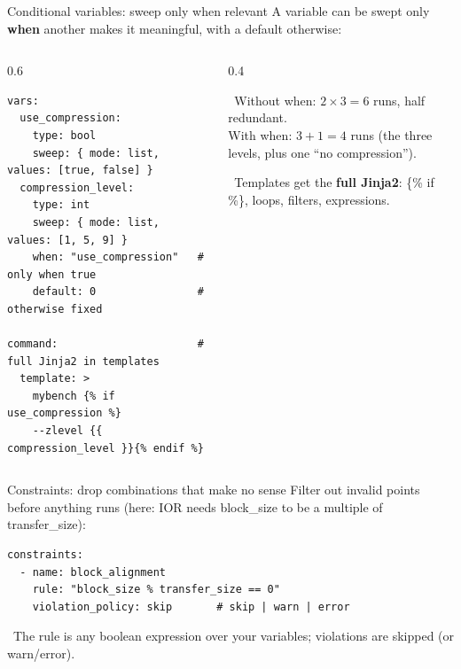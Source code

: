 \documentclass[aspectratio=169,11pt]{beamer}
\newcommand{\code}[1]{{\ttfamily\small\color{iopsNavy}#1}}
\newcommand{\hl}[1]{{\color{iopsPink}\bfseries #1}}
\begin{document}
\begin{frame}[fragile]{Conditional variables: sweep only when relevant}
  A variable can be swept only \hl{when} another makes it meaningful, with a
  \code{default} otherwise:
  \begin{columns}[T]
    \begin{column}{0.6\textwidth}
\begin{lstlisting}[style=yaml,basicstyle=\ttfamily\fontsize{6.6}{7.8}\selectfont,columns=fixed]
vars:
  use_compression:
    type: bool
    sweep: { mode: list, values: [true, false] }
  compression_level:
    type: int
    sweep: { mode: list, values: [1, 5, 9] }
    when: "use_compression"   # only when true
    default: 0                # otherwise fixed

command:                      # full Jinja2 in templates
  template: >
    mybench {% if use_compression %}
    --zlevel {{ compression_level }}{% endif %}
\end{lstlisting}
    \end{column}
    \begin{column}{0.4\textwidth}
      \begin{keybox}
        \faInfoCircle~Without \code{when}: $2\times3 = 6$ runs, half
        redundant.\\[3pt]
        With \code{when}: $3 + 1 = 4$ runs (the three levels, plus one
        ``no compression'').
      \end{keybox}
      \vspace{0.4em}
      \begin{keybox}[colback=iopsGreen!10, colframe=iopsGreen]
        \faCode~Templates get the \hl{full Jinja2}: \code{\{\% if \%\}}, loops,
        filters, expressions.
      \end{keybox}
    \end{column}
  \end{columns}
\end{frame}

\begin{frame}[fragile]{Constraints: drop combinations that make no sense}
  Filter out invalid points before anything runs (here: IOR needs
  \code{block\_size} to be a multiple of \code{transfer\_size}):
\begin{lstlisting}[style=yaml]
constraints:
  - name: block_alignment
    rule: "block_size % transfer_size == 0"
    violation_policy: skip       # skip | warn | error
\end{lstlisting}
  \begin{keybox}
    \faInfoCircle~The \code{rule} is any boolean expression over your variables;
    violations are \code{skip}ped (or \code{warn}/\code{error}). 
  \end{keybox}
\end{frame}
\end{document}
